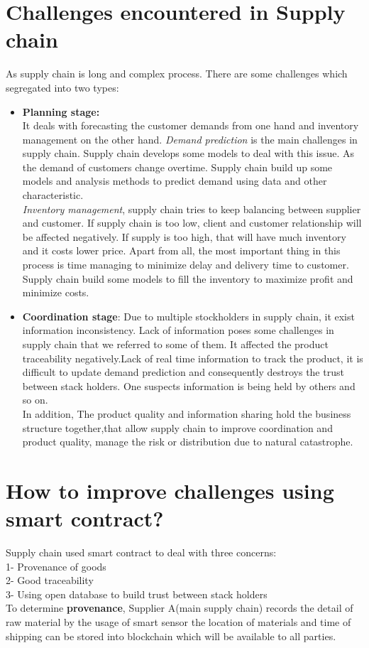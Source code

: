 \section{Challenges encountered in Supply chain}
As supply chain is long and complex process. There are some challenges which segregated into two types:\\
\begin{itemize}

\item \textbf{Planning stage:}\\
It deals with forecasting the customer demands from one hand and inventory management on the other hand. 
\textit{Demand prediction} is the main challenges in supply chain. Supply chain develops some models to deal with this issue. As the demand of customers change overtime.
Supply chain build up some models and analysis methods 
to predict demand using data and other characteristic.  \\
\textit{Inventory management}, supply chain tries to keep balancing between supplier and customer. If supply chain is too low, client and customer relationship will be affected negatively. If supply is too high, that will have much inventory and it costs lower price. Apart from all, the most important thing in this process is time managing to minimize delay and delivery time to customer. Supply chain build some models to fill the inventory to maximize profit and minimize costs.

\item \textbf{Coordination stage}:
Due to multiple stockholders in supply chain, it exist information inconsistency. Lack of information poses some challenges in supply chain that we referred to some of them. It affected the product traceability negatively.Lack of real time information to track the product, it is difficult to update demand prediction and consequently destroys the trust between stack holders. One suspects information is being held by others and so on.\\ 
In addition, The product quality and information sharing hold the business structure together,that allow supply chain to improve coordination and product quality, manage the risk or distribution due to natural catastrophe\cite{Angwei}. 
\end{itemize}
\section{How to improve challenges using smart contract?}
Supply chain used smart contract to deal with three concerns:\\
1- Provenance of goods\\
2- Good traceability\\
3- Using open database to build trust between stack holders\\
To determine \textbf{provenance}, Supplier A(main supply chain) records the detail of raw material by the usage of smart sensor the location of materials and time of shipping can be stored into blockchain which will be available to all parties.\\

